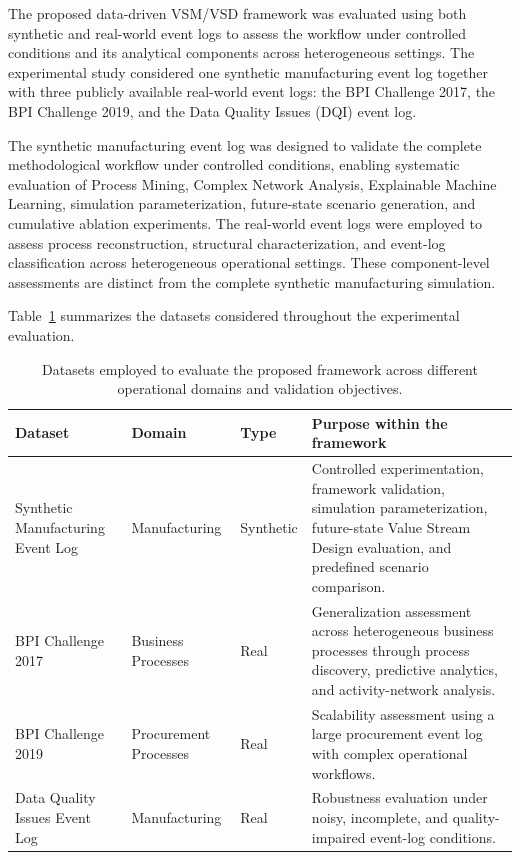 \documentclass[pdflatex,iicol,Numbered,sn-basic]{sn-jnl}
\begin{document}
The proposed data-driven VSM/VSD framework was evaluated using both synthetic and real-world event logs to assess the workflow under controlled conditions and its analytical components across heterogeneous settings. The experimental study considered one synthetic manufacturing event log together with three publicly available real-world event logs: the BPI Challenge 2017, the BPI Challenge 2019, and the Data Quality Issues (DQI) event log.

The synthetic manufacturing event log was designed to validate the complete methodological workflow under controlled conditions, enabling systematic evaluation of Process Mining, Complex Network Analysis, Explainable Machine Learning, simulation parameterization, future-state scenario generation, and cumulative ablation experiments. The real-world event logs were employed to assess process reconstruction, structural characterization, and event-log classification across heterogeneous operational settings. These component-level assessments are distinct from the complete synthetic manufacturing simulation.

Table~\ref{tab:datasets} summarizes the datasets considered throughout the experimental evaluation.

\begin{table}[t]
\caption{
Datasets employed to evaluate the proposed framework across different operational domains and validation objectives.
}
\label{tab:datasets}
\centering
\begin{tabularx}{\textwidth}{p{3.4cm}p{2.4cm}p{1.6cm}X}
\toprule
\textbf{Dataset} &
\textbf{Domain} &
\textbf{Type} &
\textbf{Purpose within the framework} \\
\midrule

Synthetic Manufacturing Event Log
&
Manufacturing
&
Synthetic
&
Controlled experimentation, framework validation, simulation parameterization, future-state Value Stream Design evaluation, and predefined scenario comparison.
\\

BPI Challenge 2017
&
Business Processes
&
Real
&
Generalization assessment across heterogeneous business processes through process discovery, predictive analytics, and activity-network analysis.
\\

BPI Challenge 2019
&
Procurement Processes
&
Real
&
Scalability assessment using a large procurement event log with complex operational workflows.
\\

Data Quality Issues Event Log
&
Manufacturing
&
Real
&
Robustness evaluation under noisy, incomplete, and quality-impaired event-log conditions.
\\

\bottomrule
\end{tabularx}
\end{table}
\end{document}
